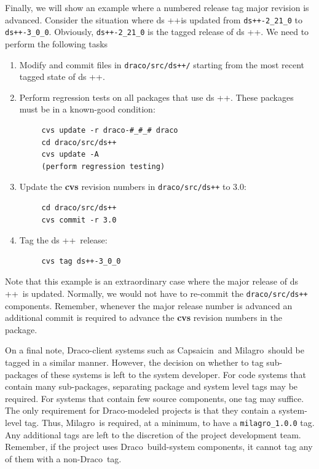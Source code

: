 \documentclass[11pt]{nmemo}
\newcommand{\draco}{{\normalfont\normalsize\sffamily Draco}}
\newcommand{\milagro}{{\normalfont\normalsize\sffamily Milagro}}
\newcommand{\capsaicin}{{\normalfont\normalsize\sffamily Capsaicin}}
\newcommand{\dsxx}{{\normalfont\normalsize\sffamily ds\raisebox{.2ex}
  {\scriptsize ++}}}
\begin{document}
Finally, we will show an example where a numbered release tag major
revision is advanced.  Consider the situation where \dsxx is updated
from \texttt{ds++-2\_21\_0} to \texttt{ds++-3\_0\_0}.  Obviously,
\texttt{ds++-2\_21\_0} is the tagged release of \dsxx.  We need to
perform the following tasks
\begin{enumerate}
\item Modify and commit files in \texttt{draco/src/ds++/} starting
  from the most recent tagged state of \dsxx.
\item Perform regression tests on all packages that use \dsxx.  These
  packages must be in a known-good condition:
\begin{verbatim}
     cvs update -r draco-#_#_# draco
     cd draco/src/ds++
     cvs update -A
     (perform regression testing)
\end{verbatim}
\item Update the {\bf cvs} revision numbers in \texttt{draco/src/ds++} 
  to 3.0:
\begin{verbatim}
     cd draco/src/ds++
     cvs commit -r 3.0
\end{verbatim}
\item Tag the \dsxx\ release:
\begin{verbatim}
     cvs tag ds++-3_0_0
\end{verbatim}
\end{enumerate}
Note that this example is an extraordinary case where the major
release of \dsxx\ is updated.  Normally, we would not have to
re-commit the \texttt{draco/src/ds++} components.  Remember, whenever
the major release number is advanced an additional commit is required
to advance the {\bf cvs} revision numbers in the package.

On a final note, \draco-client systems such as \capsaicin\ and
\milagro\ should be tagged in a similar manner.  However, the decision
on whether to tag sub-packages of these systems is left to the system
developer.  For code systems that contain many sub-packages,
separating package and system level tags may be required.  For systems
that contain few source components, one tag may suffice.  The only
requirement for \draco-modeled projects is that they contain a
system-level tag.  Thus, \milagro\ is required, at a minimum, to have
a \texttt{milagro\_1.0.0} tag.  Any additional tags are left to the
discretion of the project development team.  Remember, if the project
uses \draco\ build-system components, it cannot tag any of them with a
non-\draco\ tag.
\end{document}
